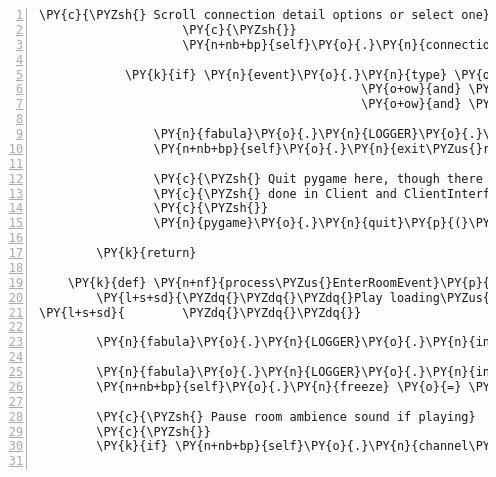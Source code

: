 \begin{Verbatim}[commandchars=\\\{\},numbers=left,firstnumber=1,stepnumber=1]
                    \PY{c}{\PYZsh{} Scroll connection detail options or select one}
                    \PY{c}{\PYZsh{}}
                    \PY{n+nb+bp}{self}\PY{o}{.}\PY{n}{connection\PYZus{}details\PYZus{}menu}\PY{o}{.}\PY{n}{process\PYZus{}key\PYZus{}input}\PY{p}{(}\PY{n}{event}\PY{o}{.}\PY{n}{key}\PY{p}{)}

            \PY{k}{if} \PY{n}{event}\PY{o}{.}\PY{n}{type} \PY{o}{==} \PY{n}{pygame}\PY{o}{.}\PY{n}{QUIT} \PY{o+ow}{or} \PY{p}{(}\PY{n}{event}\PY{o}{.}\PY{n}{type} \PY{o}{==} \PY{n}{pygame}\PY{o}{.}\PY{n}{KEYDOWN}
                                             \PY{o+ow}{and} \PY{n}{event}\PY{o}{.}\PY{n}{key} \PY{o}{==} \PY{n}{pygame}\PY{o}{.}\PY{n}{K\PYZus{}q}
                                             \PY{o+ow}{and} \PY{n}{pygame}\PY{o}{.}\PY{n}{key}\PY{o}{.}\PY{n}{get\PYZus{}mods}\PY{p}{(}\PY{p}{)} \PY{o}{\PYZam{}} \PY{n}{pygame}\PY{o}{.}\PY{n}{KMOD\PYZus{}CTRL}\PY{p}{)}\PY{p}{:}

                \PY{n}{fabula}\PY{o}{.}\PY{n}{LOGGER}\PY{o}{.}\PY{n}{info}\PY{p}{(}\PY{l+s}{\PYZdq{}}\PY{l+s}{exit request from user}\PY{l+s}{\PYZdq{}}\PY{p}{)}
                \PY{n+nb+bp}{self}\PY{o}{.}\PY{n}{exit\PYZus{}requested} \PY{o}{=} \PY{n+nb+bp}{True}

                \PY{c}{\PYZsh{} Quit pygame here, though there is still shutdown work to be}
                \PY{c}{\PYZsh{} done in Client and ClientInterface.}
                \PY{c}{\PYZsh{}}
                \PY{n}{pygame}\PY{o}{.}\PY{n}{quit}\PY{p}{(}\PY{p}{)}

        \PY{k}{return}

    \PY{k}{def} \PY{n+nf}{process\PYZus{}EnterRoomEvent}\PY{p}{(}\PY{n+nb+bp}{self}\PY{p}{,} \PY{n}{event}\PY{p}{)}\PY{p}{:}
        \PY{l+s+sd}{\PYZdq{}\PYZdq{}\PYZdq{}Play loading\PYZus{}sound.}
\PY{l+s+sd}{        \PYZdq{}\PYZdq{}\PYZdq{}}

        \PY{n}{fabula}\PY{o}{.}\PY{n}{LOGGER}\PY{o}{.}\PY{n}{info}\PY{p}{(}\PY{l+s}{\PYZdq{}}\PY{l+s}{entering room: \PYZob{}\PYZcb{}}\PY{l+s}{\PYZdq{}}\PY{o}{.}\PY{n}{format}\PY{p}{(}\PY{n}{event}\PY{o}{.}\PY{n}{room\PYZus{}identifier}\PY{p}{)}\PY{p}{)}

        \PY{n}{fabula}\PY{o}{.}\PY{n}{LOGGER}\PY{o}{.}\PY{n}{info}\PY{p}{(}\PY{l+s}{\PYZdq{}}\PY{l+s}{freezing}\PY{l+s}{\PYZdq{}}\PY{p}{)}
        \PY{n+nb+bp}{self}\PY{o}{.}\PY{n}{freeze} \PY{o}{=} \PY{n+nb+bp}{True}

        \PY{c}{\PYZsh{} Pause room ambience sound if playing}
        \PY{c}{\PYZsh{}}
        \PY{k}{if} \PY{n+nb+bp}{self}\PY{o}{.}\PY{n}{channel\PYZus{}ambience}\PY{o}{.}\PY{n}{get\PYZus{}busy}\PY{p}{(}\PY{p}{)}\PY{p}{:}


\end{Verbatim}
